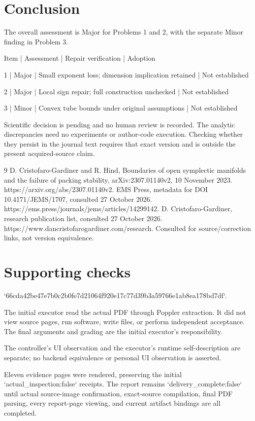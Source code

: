 \documentclass[10pt]{article}
\begin{document}
\section*{Conclusion}
The overall assessment is Major for Problems 1 and 2, with the separate Minor finding in Problem 3.\par
Item | Assessment | Repair verification | Adoption\par
1 | Major | Small exponent loss; dimension implication retained | Not established\par
2 | Major | Local sign repair; full construction unchecked | Not established\par
3 | Minor | Convex tube bounds under original assumptions | Not established\par
Scientific decision is pending and no human review is recorded. The analytic discrepancies need no experiments or author-code execution. Checking whether they persist in the journal text requires that exact version and is outside the present acquired-source claim.\par
9 D. Cristofaro-Gardiner and R. Hind, Boundaries of open symplectic manifolds and the failure of packing stability, arXiv:2307.01140v2, 10 November 2023. https://arxiv.org/abs/2307.01140v2. EMS Press, metadata for DOI 10.4171/JEMS/1707, consulted 27 October 2026. https://ems.press/journals/jems/articles/14299142. D. Cristofaro-Gardiner, research publication list, consulted 27 October 2026. https://www.dancristofarogardiner.com/research. Consulted for source/correction links, not version equivalence.\par
\section*{Supporting checks}
`66cda42be47e7b0c2b0fe7d21064f920e17c77d39b3a59766e1ab8ea178bd7df`.\par
The initial executor read the actual PDF through Poppler extraction. It did not view source pages, run software, write files, or perform independent acceptance. The final arguments and grading are the initial executor’s responsibility.\par
The controller’s UI observation and the executor’s runtime self-description are separate; no backend equivalence or personal UI observation is asserted.\par
Eleven evidence pages were rendered, preserving the initial `actual\_inspection:false` receipts. The report remains `delivery\_complete:false` until actual source-image confirmation, exact-source compilation, final PDF parsing, every report-page viewing, and current artifact bindings are all completed.\par
\end{document}
